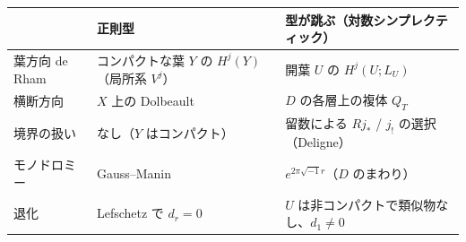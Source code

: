 \begin{center}\small
\begin{tabular}{>{\raggedright\arraybackslash}p{3.0cm}>{\raggedright\arraybackslash}p{5.4cm}>{\raggedright\arraybackslash}p{5.6cm}}\toprule
 & 正則型 & 型が跳ぶ（対数シンプレクティック）\\\midrule
葉方向 de Rham & コンパクトな葉 $Y$ の $H^j(Y)$（局所系 $V^j$） & 開葉 $U$ の $H^j(U;L_U)$\\\midrule
横断方向 & $X$ 上の Dolbeault & $D$ の各層上の複体 $Q_T$\\\midrule
境界の扱い & なし（$Y$ はコンパクト） & 留数による $Rj_*$ / $j_!$ の選択（Deligne）\\\midrule
モノドロミー & Gauss--Manin & $e^{2\pi\sqrt{-1}r}$（$D$ のまわり）\\\midrule
退化 & Lefschetz で $d_r=0$ & $U$ は非コンパクトで類似物なし、$d_1\ne0$\\\bottomrule
\end{tabular}
\end{center}
